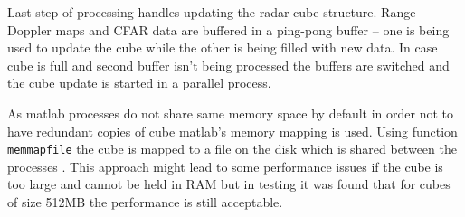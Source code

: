 Last step of processing handles updating the radar cube structure.
Range-Doppler maps and CFAR data are buffered in a ping-pong buffer -- one is being used to update the cube while the other is being filled with new data.
In case cube is full and second buffer isn't being processed the buffers are switched and the cube update is started in a parallel process.

As matlab processes do not share same memory space by default in order not to have redundant copies of cube matlab's memory mapping is used.
Using function \texttt{memmapfile} the cube is mapped to a file on the disk which is shared between the processes \cite{matlab_memory}.
This approach might lead to some performance issues if the cube is too large and cannot be held in RAM but in testing it was found that for cubes of size 512MB the performance is still acceptable.


